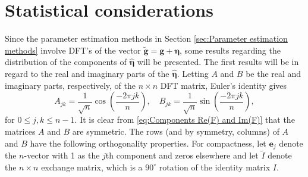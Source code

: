 \documentclass[12pt]{article}
\newcommand{\gVec}{\mathbf{g}}	%
\newcommand{\gnoiseVec}{\widetilde{\mathbf{g}}}	%
\newcommand{\noise}{\eta}	%
\newcommand{\noiseVec}{\bm{\noise}}	%
\begin{document}
\section{Statistical considerations} \label{sec:Stats.}

Since the parameter estimation methods in Section \ref{sec:Parameter estimation methods} involve DFT's of the vector $\gnoiseVec = \gVec + \noiseVec$, some results regarding the distribution of the components of $\widehat{\noiseVec}$ will be presented. The first results will be in regard to the real and imaginary parts of the $\widehat{\noiseVec}$. Letting $A$ and $B$ be the real and imaginary parts, respectively, of the $n \times n$ DFT matrix, Euler's identity gives
\begin{equation}
A_{jk} = \frac{1}{\sqrt{n}}\cos\left(\frac{-2\pi{jk}}{n}\right), \quad B_{jk} = \frac{1}{\sqrt{n}}\sin\left(\frac{-2\pi{jk}}{n}\right),
\label{eq:Components Re(F) and Im(F)}
\end{equation}
for $0 \leq j,k \leq n-1$. It is clear from \eqref{eq:Components Re(F) and Im(F)} that the matrices $A$ and $B$ are symmetric. The rows (and by symmetry, columns) of $A$ and $B$ have the following orthogonality properties. For compactness, let $\mathbf{e}_j$ denote the $n$-vector with 1 as the $j$th component and zeros elsewhere and let $\tilde{I}$ denote the $n \times n$ exchange matrix, which is a $90^\circ$ rotation of the identity matrix $I$.
\end{document}
